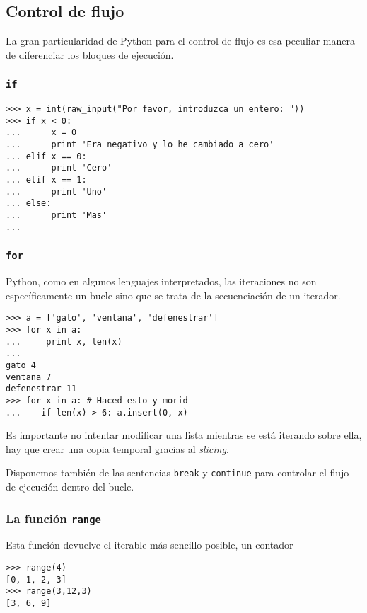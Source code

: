 \documentclass[a4paper,10pt]{article}
\begin{document}
\subsection{Control de flujo}

La gran particularidad de Python para el control de flujo es esa
peculiar manera de diferenciar los bloques de ejecución.

\subsubsection{\texttt{if}}

\begin{lstlisting}
>>> x = int(raw_input("Por favor, introduzca un entero: "))
>>> if x < 0:
...      x = 0
...      print 'Era negativo y lo he cambiado a cero'
... elif x == 0:
...      print 'Cero'
... elif x == 1:
...      print 'Uno'
... else:
...      print 'Mas'
...
\end{lstlisting}

\subsubsection{\texttt{for}}

Python, como en algunos lenguajes interpretados, las iteraciones no
son específicamente un bucle sino que se trata de la secuenciación de
un iterador.

\begin{lstlisting}
>>> a = ['gato', 'ventana', 'defenestrar']
>>> for x in a:
...     print x, len(x)
... 
gato 4
ventana 7
defenestrar 11
>>> for x in a: # Haced esto y morid
...    if len(x) > 6: a.insert(0, x)
\end{lstlisting}

Es importante no intentar modificar una lista mientras se está
iterando sobre ella, hay que crear una copia temporal gracias al
\emph{slicing}.

Disponemos también de las sentencias \texttt{break} y
\texttt{continue} para controlar el flujo de ejecución dentro del
bucle.

\subsubsection{La función \texttt{range}}

Esta función devuelve el iterable más sencillo posible, un contador

\begin{lstlisting}
>>> range(4)
[0, 1, 2, 3]
>>> range(3,12,3)
[3, 6, 9]
\end{lstlisting}
\end{document}
